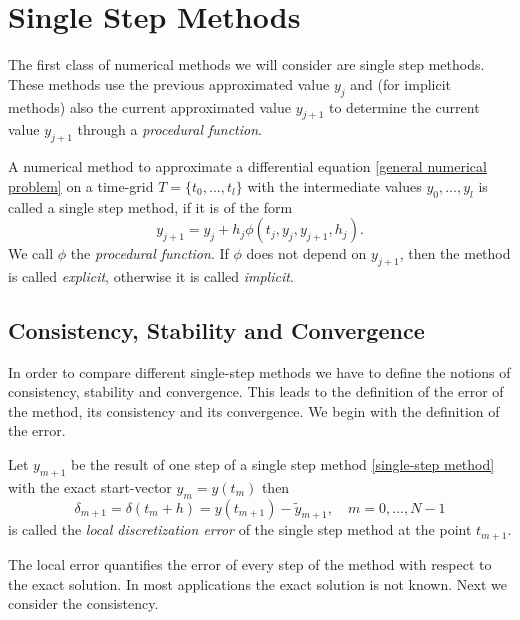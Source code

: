 \section{Single Step Methods}
	The first class of numerical methods we will consider are single step methods. These methods use the previous approximated value $y_j$ and (for implicit methods) also the current approximated value $y_{j+1}$ to determine the current value $y_{j+1}$ through a \emph{procedural function}.
	
	\begin{definition}
		\label{def:single step mehod}
		A numerical method to approximate a differential equation \ref{general numerical problem} on a time-grid $T =\{t_0,...,t_l\}$ with the intermediate values $y_0,...,y_l$ is called a single step method, if it is of the form
		\begin{equation}
			\label{single-step method}
			y_{j+1} = y_j + h_j \phi(t_j,y_j, y_{j+1},h_j).
		\end{equation}
		We call $\phi$ the \emph{procedural function}. If $\phi$ does not depend on $y_{j+1}$, then the method is called \emph{explicit}, otherwise it is called \emph{implicit}.
	\end{definition}

	\subsection{Consistency, Stability and Convergence}
	
	In order to compare different single-step methods we have to define the notions of consistency, stability and convergence. This leads to the definition of the error of the method, its consistency and its convergence. We begin with the definition of the error.
	
	\begin{definition}\label{Discretization_Error_SingleStep}
		Let $y_{m+1}$ be the result of one step of a single step method \eqref{single-step method} with the exact start-vector $y_m = y(t_m)$ then
		\begin{equation}
			\label{local discretization error single step}
			 \delta_{m+1} = \delta(t_m+h) = y(t_{m+1}) - \tilde{y}_{m+1}, \quad m = 0,...,N-1
		\end{equation}
		is called the \emph{local discretization error} of the single step method at the point $t_{m+1}$.
	\end{definition}

	The local error quantifies the error of every step of the method with respect to the exact solution. In most applications the exact solution is not known. Next we consider the consistency.

